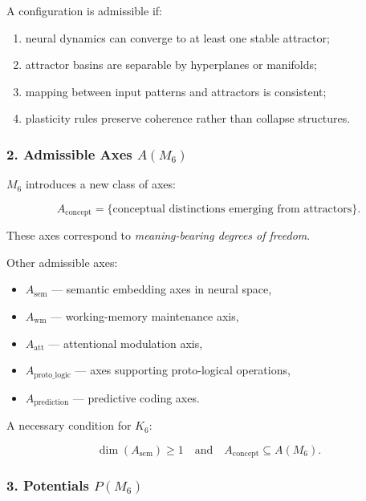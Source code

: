 A configuration is admissible if:

\begin{enumerate}
    \item neural dynamics can converge to at least one stable attractor;
    \item attractor basins are separable by hyperplanes or manifolds;
    \item mapping between input patterns and attractors is consistent;
    \item plasticity rules preserve coherence rather than collapse structures.
\end{enumerate}

\subsubsection*{2. Admissible Axes \texorpdfstring{$A(M_6)$}{A(M_6)}}

$M_6$ introduces a new class of axes:

\[
A_{\mathrm{concept}} = \{ \text{conceptual distinctions emerging from attractors} \}.
\]

These axes correspond to \emph{meaning-bearing degrees of freedom}.

Other admissible axes:

\begin{itemize}
    \item $A_{\mathrm{sem}}$ — semantic embedding axes in neural space,
    \item $A_{\mathrm{wm}}$ — working-memory maintenance axis,
    \item $A_{\mathrm{att}}$ — attentional modulation axis,
    \item $A_{\mathrm{proto\_logic}}$ — axes supporting proto-logical operations,
    \item $A_{\mathrm{prediction}}$ — predictive coding axes.
\end{itemize}

A necessary condition for $K_6$:

\[
\dim(A_{\mathrm{sem}}) \ge 1
\quad\text{and}\quad
A_{\mathrm{concept}} \subseteq A(M_6).
\]

\subsubsection*{3. Potentials \texorpdfstring{$P(M_6)$}{P(M_6)}}

